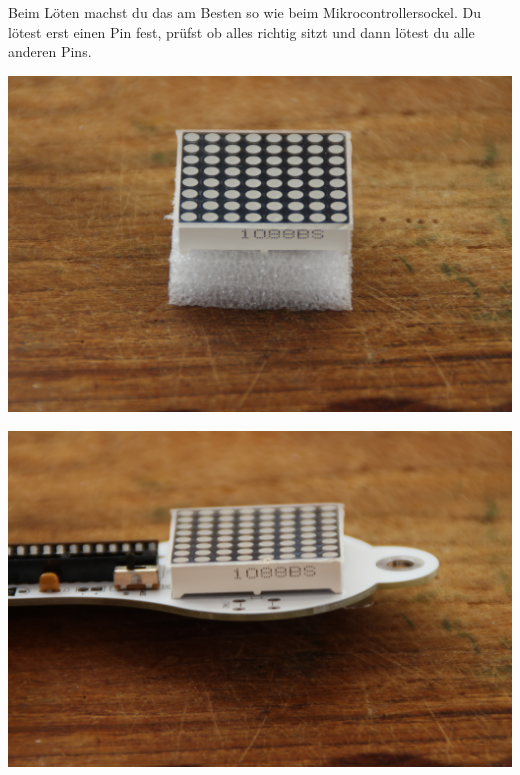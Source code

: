 \documentclass{article}
\begin{document}
Beim Löten machst du das am Besten so wie beim Mikrocontrollersockel. Du lötest erst einen Pin fest, prüfst ob alles richtig sitzt und dann lötest du alle anderen Pins.

\vspace{1cm}

\begin{minipage}[b]{0.5\textwidth}
	\includegraphics[width=\textwidth]{Bilder2023/IMG_8374.JPG}
\end{minipage}
\begin{minipage}[b]{0.5\textwidth}
	\includegraphics[width=\textwidth]{Bilder2023/IMG_8375.JPG}
\end{minipage}

\vspace{0.5cm}
\end{document}

